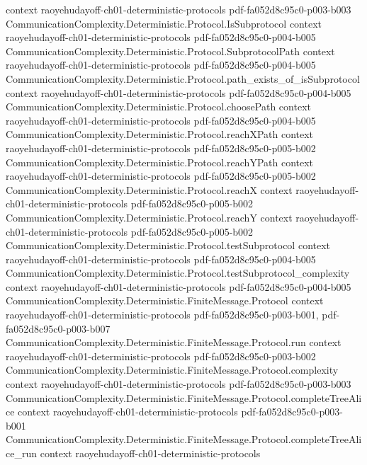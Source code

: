 \begin{theorem}
  {context}
  {raoyehudayoff-ch01-deterministic-protocols}
  {pdf-fa052d8c95c0-p003-b003}
\proofstep
  {CommunicationComplexity.Deterministic.Protocol.IsSubprotocol}
  {context}
  {raoyehudayoff-ch01-deterministic-protocols}
  {pdf-fa052d8c95c0-p004-b005}
\proofstep
  {CommunicationComplexity.Deterministic.Protocol.SubprotocolPath}
  {context}
  {raoyehudayoff-ch01-deterministic-protocols}
  {pdf-fa052d8c95c0-p004-b005}
\proofstep
  {CommunicationComplexity.Deterministic.Protocol.path_exists_of_isSubprotocol}
  {context}
  {raoyehudayoff-ch01-deterministic-protocols}
  {pdf-fa052d8c95c0-p004-b005}
\proofstep
  {CommunicationComplexity.Deterministic.Protocol.choosePath}
  {context}
  {raoyehudayoff-ch01-deterministic-protocols}
  {pdf-fa052d8c95c0-p004-b005}
\proofstep
  {CommunicationComplexity.Deterministic.Protocol.reachXPath}
  {context}
  {raoyehudayoff-ch01-deterministic-protocols}
  {pdf-fa052d8c95c0-p005-b002}
\proofstep
  {CommunicationComplexity.Deterministic.Protocol.reachYPath}
  {context}
  {raoyehudayoff-ch01-deterministic-protocols}
  {pdf-fa052d8c95c0-p005-b002}
\proofstep
  {CommunicationComplexity.Deterministic.Protocol.reachX}
  {context}
  {raoyehudayoff-ch01-deterministic-protocols}
  {pdf-fa052d8c95c0-p005-b002}
\proofstep
  {CommunicationComplexity.Deterministic.Protocol.reachY}
  {context}
  {raoyehudayoff-ch01-deterministic-protocols}
  {pdf-fa052d8c95c0-p005-b002}
\proofstep
  {CommunicationComplexity.Deterministic.Protocol.testSubprotocol}
  {context}
  {raoyehudayoff-ch01-deterministic-protocols}
  {pdf-fa052d8c95c0-p004-b005}
\proofstep
  {CommunicationComplexity.Deterministic.Protocol.testSubprotocol_complexity}
  {context}
  {raoyehudayoff-ch01-deterministic-protocols}
  {pdf-fa052d8c95c0-p004-b005}
\proofstep
  {CommunicationComplexity.Deterministic.FiniteMessage.Protocol}
  {context}
  {raoyehudayoff-ch01-deterministic-protocols}
  {pdf-fa052d8c95c0-p003-b001,
    pdf-fa052d8c95c0-p003-b007}
\proofstep
  {CommunicationComplexity.Deterministic.FiniteMessage.Protocol.run}
  {context}
  {raoyehudayoff-ch01-deterministic-protocols}
  {pdf-fa052d8c95c0-p003-b002}
\proofstep
  {CommunicationComplexity.Deterministic.FiniteMessage.Protocol.complexity}
  {context}
  {raoyehudayoff-ch01-deterministic-protocols}
  {pdf-fa052d8c95c0-p003-b003}
\proofstep
  {CommunicationComplexity.Deterministic.FiniteMessage.Protocol.completeTreeAlice}
  {context}
  {raoyehudayoff-ch01-deterministic-protocols}
  {pdf-fa052d8c95c0-p003-b001}
\proofstep
  {CommunicationComplexity.Deterministic.FiniteMessage.Protocol.completeTreeAlice_run}
  {context}
  {raoyehudayoff-ch01-deterministic-protocols}

\end{theorem}
